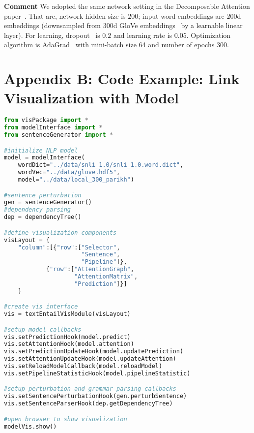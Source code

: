 \documentclass[review,journal]{vgtc}         %
\begin{document}
\textbf{Comment} We adopted the same network setting in the Decomposable Attention paper~\cite{parikh2016emnlp}. That are, network hidden size is $200$; input word embeddings are $200$d embeddings (downsampled from $300$d GloVe embeddings~\cite{PenningtonSocherManning2014} by a learnable linear layer). For learning, dropout~\cite{SrivastavaHinton2014} is $0.2$ and learning rate is $0.05$. Optimization algorithm is AdaGrad~\cite{duchi2011adaptive} with mini-batch size 64 and number of epochs 300.

\section{Appendix B: Code Example: Link Visualization with Model}
\begin{lstlisting}[language=Python, caption=Code for generating the visualization.]
from visPackage import *
from modelInterface import *
from sentenceGenerator import *

#initialize NLP model
model = modelInterface(
    wordDict="../data/snli_1.0/snli_1.0.word.dict",
    wordVec="../data/glove.hdf5", 
    model="../data/local_300_parikh")

#sentence perturbation
gen = sentenceGenerator()
#dependency parsing
dep = dependencyTree()

#define visualization components
visLayout = {
    "column":[{"row":["Selector", 
                      "Sentence", 
                      "Pipeline"]},
            {"row":["AttentionGraph", 
                    "AttentionMatrix", 
                    "Prediction"]}]
    }

#create vis interface
vis = textEntailVisModule(visLayout)

#setup model callbacks
vis.setPredictionHook(model.predict)
vis.setAttentionHook(model.attention)
vis.setPredictionUpdateHook(model.updatePrediction)
vis.setAttentionUpdateHook(model.updateAttention)
vis.setReloadModelCallback(model.reloadModel)
vis.setPipelineStatisticHook(model.pipelineStatistic)

#setup perturbation and grammar parsing callbacks
vis.setSentencePerturbationHook(gen.perturbSentence)
vis.setSentenceParserHook(dep.getDependencyTree)

#open browser to show visualization
modelVis.show()

\end{lstlisting}

%
%
%


\end{document}
